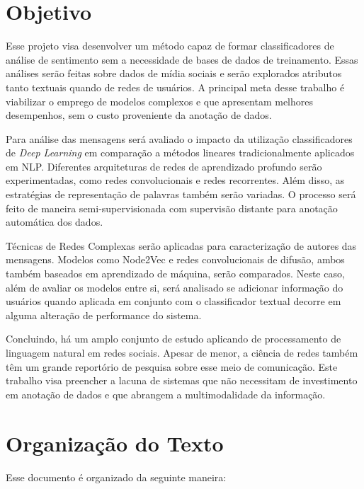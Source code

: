 \section{Objetivo}

Esse projeto visa desenvolver um método capaz de formar classificadores de
análise de sentimento sem a necessidade de bases de dados de treinamento.
Essas análises serão feitas sobre dados de mídia sociais e serão explorados
atributos tanto textuais quando de redes de usuários.
A principal meta desse trabalho é viabilizar o emprego de modelos complexos e
que apresentam melhores desempenhos, sem o custo proveniente da anotação de
dados.

Para análise das mensagens será avaliado o impacto da utilização classificadores
de \textit{Deep Learning} em comparação a métodos lineares tradicionalmente
aplicados em NLP.
Diferentes arquiteturas de redes de aprendizado profundo serão experimentadas,
como redes convolucionais e redes recorrentes.
Além disso, as estratégias de representação de palavras também serão variadas.
O processo será feito de maneira semi-supervisionada com supervisão distante
para anotação automática dos dados.

Técnicas de Redes Complexas serão aplicadas para caracterização de autores das
mensagens.
Modelos como Node2Vec e redes convolucionais de difusão, ambos também baseados em
aprendizado de máquina, serão comparados.
Neste caso, além de avaliar os modelos entre si, será analisado se adicionar
informação do usuários quando aplicada em conjunto com o classificador textual
decorre em alguma alteração de performance do sistema.

Concluindo, há um amplo conjunto de estudo aplicando de processamento de
linguagem natural em redes sociais.
Apesar de menor, a ciência de redes também têm um grande reportório de pesquisa
sobre esse meio de comunicação.
Este trabalho visa preencher a lacuna de sistemas que não necessitam de
investimento em anotação de dados e que abrangem a multimodalidade da
informação.

\section{Organização do Texto}

Esse documento é organizado da seguinte maneira:

